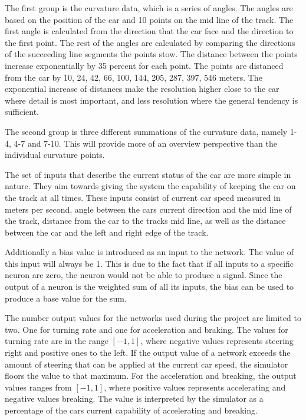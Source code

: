 The first group is the curvature data, which is a series of angles. The angles are based on the position of the car and 10 points on the mid line of the track. The first angle is calculated from the direction that the car face and the direction to the first point. The rest of the angles are calculated by comparing the directions of the succeeding line segments the points stow. The distance between the points increase exponentially by 35 percent for each point. The points are distanced from the car by 10, 24, 42, 66, 100, 144, 205, 287, 397, 546 meters. The exponential increase of distances make the resolution higher close to the car where detail is most important, and less resolution where the general tendency is sufficient.

The second group is three different summations of the curvature data, namely 1-4, 4-7 and 7-10. This will provide more of an overview perspective than the individual curvature points.

The set of inputs that describe the current status of the car are more simple in nature. They aim towards giving the system the capability of keeping the car on the track at all times. These inputs consist of current car speed measured in meters per second, angle between the cars current direction and the mid line of the track, distance from the car to the tracks mid line, as well as the distance between the car and the left and right edge of the track.

Additionally a bias value is introduced as an input to the network. The value of this input will always be 1. This is due to the fact that if all inputs to a specific neuron are zero, the neuron would not be able to produce a signal. Since the output of a neuron is the weighted sum of all its inputs, the bias can be used to produce a base value for the sum. 

The number output values for the networks used during the project are limited to two. One for turning rate and one for acceleration and braking. The values for turning rate are in the range $[-1,1]$, where negative values represents steering right and positive ones to the left. If the output value of a network exceeds the amount of steering that can be applied at the current car speed, the simulator floors the value to that maximum. For the acceleration and breaking, the output values ranges from $[-1, 1]$, where positive values represents accelerating and negative values breaking. The value is interpreted by the simulator as a percentage of the cars current capability of accelerating and breaking.

